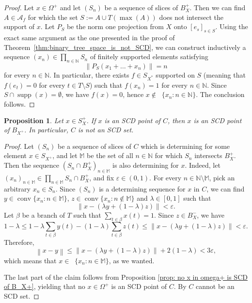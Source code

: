 \documentclass[11pt,a4paper,reqno]{amsart}
\numberwithin{equation}{section}
\newcommand{\norm}[1]{\left\lVert#1\right\rVert}
\newcommand{\N}{\mathbb{N}}
\newcommand{\M}{\mathbb{M}}
\newcommand{\A}{\mathcal{A}}
\newcommand{\eps}{\varepsilon}
\DeclareMathOperator{\supp}{supp}
\DeclareMathOperator{\conv}{conv}
\DeclareMathOperator{\cconv}{\overline{conv}}
\newcommand{\1}{\mathbbm{1}}
\renewcommand{\leq}{\leqslant}
\theoremstyle{plain}
\newtheorem{proposition}[theorem]{Proposition}
\theoremstyle{definition}
\begin{document}
\begin{proof}
    Let $x\in\Omega^+$ and let $(S_n)$ be a sequence of slices of $B_X^+$. Then we can find $A\in\A_f$ for which the set $S:=A\cup T(\max(A))$ does not intersect the support of $x$. Let $P_S$ be the norm one projection from $X$ onto $[e_s]_{s\in S}$. Using the exact same argument as the one presented in the proof of Theorem~\ref{thm:binary_tree_space_is_not_SCD}, we can construct inductively a sequence $(x_n)\in \prod_{n\in\N} S_n$ of finitely supported elements satisfying \begin{equation*}
        \norm{P_S(x_1+\dots+x_n)}=n
    \end{equation*} for every $n\in \N$. In particular, there exists $f\in S_{X^*}$ supported on $S$ (meaning that $f(e_t)=0$ for every $t\in T\setminus S$) such that $f(x_n)=1$ for every $n\in \N$. Since $S\cap\supp(x)=\emptyset$, we have $f(x)=0$, hence $x\notin \cconv\{x_n\colon n\in\N\}$. The conclusion follows. 
\end{proof}

\begin{proposition}
 Let $x\in S_X^+$. If $x$ is an SCD point of $C$, then $x$ is an SCD point of $B_{X^+}$. In particular, $C$ is not an SCD set. 
\end{proposition}


\begin{proof}
   Let $(S_n)$ be a sequence of slices of $C$ which is determining for some element $x\in S_{X^+}$, and let $\M$ be the set of all $n\in\N$ for which $S_n$ intersects $B_X^+$. Then the sequence $(S_n\cap B_X^+)_{n\in\M}$ is also determining for $x$. Indeed, let $(x_n)_{n\in \M}\in\prod_{n\in\M}S_n\cap B_X^+$, and fix $\eps\in(0,1)$. For every $n\in \N\setminus\M$, pick an arbitrary $x_n\in S_n$. Since $(S_n)$ is a determining sequence for $x$ in $C$, we can find $y\in \conv\{x_n\colon n\in\M\}$, $z\in \conv\{x_n\colon n\notin \M\}$ and $\lambda\in[0,1]$ such that \begin{equation*}
   \norm{x-(\lambda y+(1-\lambda)z)}<\eps.
   \end{equation*} Let $\beta$ be a branch of $T$ such that $\sum_{t\in\beta}x(t)=1$. Since $z\in B_X^-$, we have \begin{equation*}
      1-\lambda\leq 1-\lambda\sum_{t\in\beta}y(t)-(1-\lambda)\sum_{t\in\beta}z(t)\leq\norm{x-(\lambda y+(1-\lambda)z)}<\eps.
   \end{equation*}
   Therefore, \begin{equation*}
       \norm{x-y}\leq \norm{x-(\lambda y+(1-\lambda)z)}+2(1-\lambda)<3\eps,
   \end{equation*} which means that $x\in\cconv\{x_n\colon n\in\M\}$, as we wanted.
   
   The last part of the claim follows from Proposition \ref{prop: no x in omega+ is SCD of B_X+}, yielding that no $x\in\Omega^+$ is an SCD point of $C$. By \cite[Lemma~2.8]{LLMRZ24} $C$ cannot be an SCD set.
\end{proof}
\end{document}
